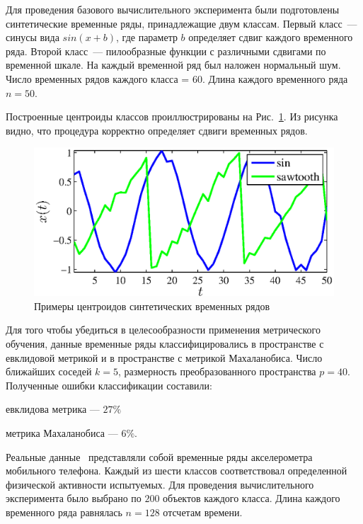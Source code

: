 	Для проведения базового вычислительного эксперимента были подготовлены синтетические временные ряды, принадлежащие двум классам.
	Первый класс~--- синусы вида $sin(x + b)$, где параметр $b$ определяет сдвиг каждого временного ряда.
	Второй класс~--- пилообразные функции с различными сдвигами по временной шкале.
	На каждый временной ряд был наложен нормальный шум.
	Число временных рядов каждого класса = 60.
	Длина каждого временного ряда $n = 50$.
	
	Построенные центроиды классов проиллюстрированы на Рис.~\ref{centroids_synthetic}.
	Из рисунка видно, что процедура корректно определяет сдвиги временных рядов.
	\begin{figure}[ht]
		\centering
		\includegraphics[width=0.45\linewidth]{figs/ch4/centroids_synthetic_noize}
		\caption{Примеры центроидов синтетических временных рядов}
		\label{centroids_synthetic}
	\end{figure}
	
	Для того чтобы убедиться в целесообразности применения метрического обучения, данные
	временные ряды классифицировались в пространстве с евклидовой метрикой и в пространстве с метрикой Махаланобиса.
	Число ближайших соседей $k = 5$, размерность преобразованного пространства $p = 40$.
	Полученные ошибки классификации составили:
	
	евклидова метрика --- $27\%$
	
	метрика Махаланобиса --- $6\%$.
	
	Реальные данные~\cite{wisdm} представляли собой временные ряды акселерометра мобильного телефона.
	Каждый из шести классов соответствовал определенной физической активности испытуемых.
	Для проведения вычислительного эксперимента было выбрано по $200$ объектов каждого класса.
	Длина каждого временного ряда равнялась $n = 128$ отсчетам времени.
	
